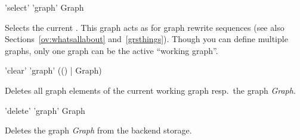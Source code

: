 \begin{rail}
  'select' 'graph' Graph
\end{rail}
Selects the current . This graph acts as \emph{} for graph rewrite sequences (see also Sections~\ref{ov:whatsallabout} and~\ref{grsthings}). Though you can define multiple graphs, only one graph can be the active ``working graph''.

\begin{rail}
  'clear' 'graph' (() | Graph)
\end{rail}
Deletes all graph elements of the current working graph resp.\ the graph \emph{Graph}.

\begin{rail}
  'delete' 'graph' Graph
\end{rail}
Deletes the graph \emph{Graph} from the backend storage.

